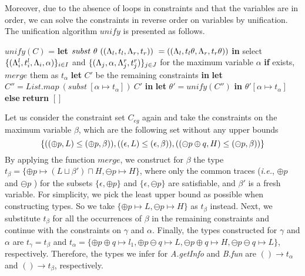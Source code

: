 {{{Moreover, due to the absence of  loops in constraints and that the variables are in order, we can solve the constraints in reverse order on variables by unification. The unification algorithm $unify$ is presented as follows.
{
\begin{algorithmic}
\STATE $unify(C)$ =
\STATE \quad \textbf{let} $subst ~\theta~(({\Lambda_l},{t_l},{\Lambda_r},{t_r}))~ = (({\Lambda_l},{t_l\theta},{\Lambda_r},{t_r\theta}))$ \textbf{in}
\STATE \quad select $\{({\Lambda_i^l},{t_i^l},{\Lambda_i},{\alpha})\}_{i\in I}$ and $\{({\Lambda_j},{\alpha},{\Lambda_j^r},{t_j^r})\}_{j\in J}$ for the maximum variable $\alpha$ \textbf{if} exists, $merge$ them as $t_{\alpha}$
\STATE \quad\quad \textbf{let} $C'$ be the remaining constraints \textbf{in} 
\STATE \quad\quad \textbf{let} $C'' = List.map~ (subst~[\alpha \mapsto t_{\alpha}])~ C'$ \textbf{in} 
\STATE \quad\quad \textbf{let} $\theta' = unify(C'')$ \textbf{in} $\theta'[\alpha \mapsto t_{\alpha}]$
\STATE \quad \textbf{else} \textbf{return} $[]$
\end{algorithmic}
}

Let us consider the constraint set $C_{eg}$ again and take the constraints on the maximum variable $\beta$, which are the following set without any upper bounds
{\small
$$
\{((\oplus p,L)\leq(\oplus p,\beta)),
((\epsilon,L)\leq(\epsilon,\beta)),
((\ominus p\oplus q,H)\leq(\ominus p,\beta))\}
$$
}
By applying the function $merge$, we construct for $\beta$ the type $t_{\beta} = \{\oplus p \mapsto (L\sqcup \beta')\sqcap H, \ominus p \mapsto H\}$,  where only the common traces (\emph{i.e.}, $\oplus p$ and $\ominus p$ ) for the subsets $\{\epsilon, \oplus p\}$ and $\{\epsilon, \ominus p\} $ are satisfiable, and $\beta'$ is a fresh variable.
For simplicity, we pick the least upper bound as possible when constructing types.
So we take $\{\oplus p \mapsto L, \ominus p \mapsto H\}$ as $t_{\beta}$ instead.
Next, we substitute $t_{\beta}$ for all the occurrences of $\beta$ in the remaining constraints and continue with the constraints on $\gamma$ and $\alpha$.
Finally, the types constructed for $\gamma$ and $\alpha$ are $t_{\gamma} = t_{\beta}$ and $t_{\alpha} = \{\oplus p\oplus q \mapsto l_1, \oplus p\ominus q\mapsto L, \ominus p\oplus q \mapsto H, \ominus p\ominus q \mapsto L\}$, respectively.
Therefore, the types we infer for \textit{A.getInfo} and \textit{B.fun} are $()\rightarrow t_{\alpha}$ and $()\rightarrow t_{\beta}$, respectively.


}}}
